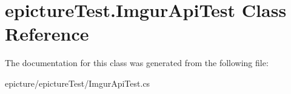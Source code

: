 \hypertarget{classepicture_test_1_1_imgur_api_test}{}\section{epicture\+Test.\+Imgur\+Api\+Test Class Reference}
\label{classepicture_test_1_1_imgur_api_test}


The documentation for this class was generated from the following file\+:\begin{DoxyCompactItemize}
\item 
epicture/epicture\+Test/Imgur\+Api\+Test.\+cs\end{DoxyCompactItemize}
